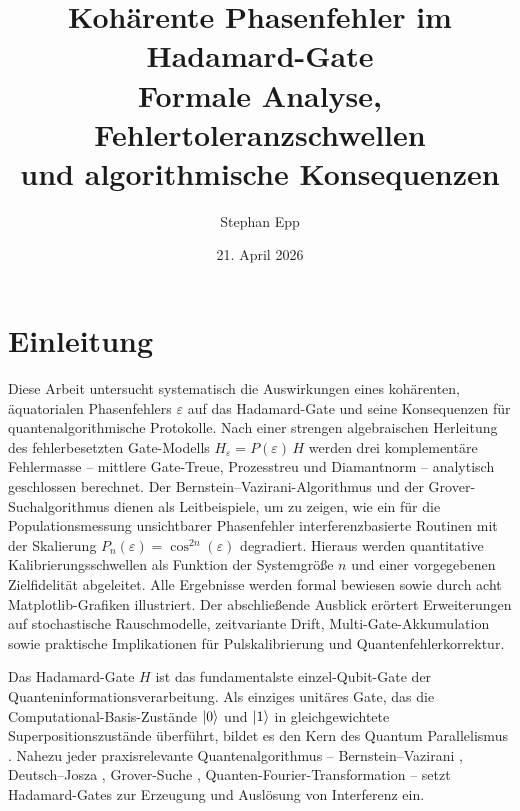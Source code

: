 ﻿\documentclass[11pt,a4paper]{article}
\title{{\bfseries Kohärente Phasenfehler im Hadamard-Gate}\\[-0.1em]
  \Large Formale Analyse, Fehlertoleranzschwellen\\[-0.1em]
  und algorithmische Konsequenzen}
\date{21. April 2026}
\author{Stephan Epp}
\theoremstyle{definition}
\newcommand{\eps}{\varepsilon}
\begin{document}
\maketitle
\tableofcontents
\newpage

\section{Einleitung}
\label{sec:intro}
Diese Arbeit untersucht systematisch die Auswirkungen eines kohärenten,
äquatorialen Phasenfehlers $\varepsilon$ auf das Hadamard-Gate und seine
Konsequenzen für quantenalgorithmische Protokolle.  Nach einer strengen
algebraischen Herleitung des fehlerbesetzten Gate-Modells
$H_\varepsilon = P(\varepsilon)\,H$ werden drei komplementäre
Fehlermasse -- mittlere Gate-Treue, Prozesstreu und Diamantnorm --
analytisch geschlossen berechnet.  Der Bernstein--Vazirani-Algorithmus
und der Grover-Suchalgorithmus dienen als Leitbeispiele, um zu zeigen,
wie ein für die Populationsmessung unsichtbarer Phasenfehler
interferenzbasierte Routinen mit der Skalierung
$P_n(\eps) = \cos^{2n}(\eps)$ degradiert.  Hieraus werden quantitative
Kalibrierungsschwellen als Funktion der Systemgröße $n$ und einer
vorgegebenen Zielfidelität abgeleitet. Alle Ergebnisse werden formal
bewiesen sowie durch acht Matplotlib-Grafiken illustriert.  Der
abschließende Ausblick erörtert Erweiterungen auf stochastische
Rauschmodelle, zeitvariante Drift, Multi-Gate-Akkumulation sowie
praktische Implikationen für Pulskalibrierung und Quantenfehlerkorrektur.

Das Hadamard-Gate $H$ ist das fundamentalste einzel-Qubit-Gate der
Quanteninformationsverarbeitung.  Als einziges unitäres Gate, das die
Computational-Basis-Zustände $\ket{0}$ und $\ket{1}$ in gleichgewichtete
Superpositionszustände überführt, bildet es den Kern des Quantum
Parallelismus \cite{Nielsen2000}.  Nahezu jeder praxisrelevante
Quantenalgorithmus -- Bernstein--Vazirani \cite{BV1993}, Deutsch--Josza
\cite{Deutsch1992}, Grover-Suche \cite{Grover1996}, Quanten-Fourier-Transformation
\cite{Coppersmith1994} -- setzt Hadamard-Gates zur Erzeugung und Auslösung
von Interferenz ein.
\end{document}
